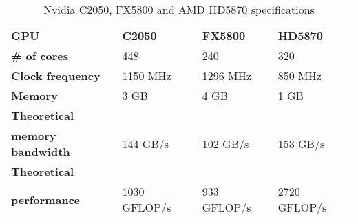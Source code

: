 	\begin{table}[h]
	\centering
	\begin{tabular}{| l l l l |}
		\hline
		\textbf{GPU} & \textbf{C2050 \cite{c2050}} & \textbf{FX5800 \cite{fx5800}} & \textbf{HD5870 \cite{hd5870}} \\
		\textbf{\# of cores} & 448 & 240 & 320\footnotemark[1] \\
		\textbf{Clock frequency} & 1150 MHz & 1296 MHz & 850 MHz \\
		\textbf{Memory} & 3 GB & 4 GB & 1 GB  \\
		\textbf{Theoretical} & & & \\
		\textbf{memory bandwidth} & 144 GB/s & 102 GB/s & 153 GB/s \\
		\textbf{Theoretical} & & & \\
		\textbf{performance} & 1030 GFLOP/s & 933 GFLOP/s & 2720 GFLOP/s \\
		\hline
	\end{tabular}
	\caption[Nvidia C2050, FX5800 and AMD HD5870 specifications]{Nvidia C2050, FX5800 and AMD HD5870 specifications}
	\label{table:c2050hd5870} %
	\end{table}
	
